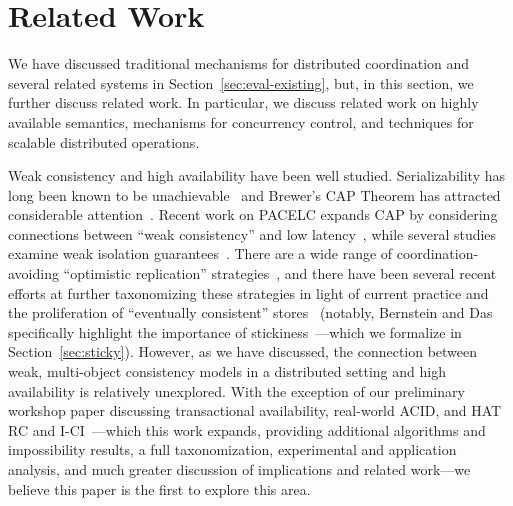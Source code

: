 
\section{Related Work}
\label{sec:relatedwork}

We have discussed traditional mechanisms for distributed
coordination and several related systems in
Section~\ref{sec:eval-existing}, but, in this section, we further discuss
related work. In particular, we discuss related work on highly
available semantics, mechanisms for concurrency control, and
techniques for scalable distributed operations.

Weak consistency and high availability have been well
studied. Serializability has long been known to be
unachievable~\cite{davidson-survey} and Brewer's CAP Theorem has
attracted considerable attention~\cite{gilbert-cap}. Recent work on
PACELC expands CAP by considering connections between ``weak
consistency'' and low latency~\cite{abadi-pacelc}, while several
studies examine weak isolation guarantees~\cite{adya,
  ansicritique}. There are a wide range of coordination-avoiding
``optimistic replication'' strategies~\cite{optimistic}, and there
have been several recent efforts at further taxonomizing these
strategies in light of current practice and the proliferation of
``eventually consistent'' stores~\cite{bailis-ec, bernstein-survey}
(notably, Bernstein and Das~\cite{bernstein-survey} specifically
highlight the importance of stickiness~\cite{sessionguarantees,
  vogels-defs}---which we formalize in Section~\ref{sec:sticky}).
However, as we have discussed, the connection between weak,
multi-object consistency models in a distributed setting and high
availability is relatively unexplored. With the exception of our
preliminary workshop paper discussing transactional availability,
real-world ACID, and HAT RC and I-CI~\cite{hat-hotos}---which this
work expands, providing additional algorithms and impossibility
results, a full taxonomization, experimental and application analysis,
and much greater discussion of implications and related work---we
believe this paper is the first to explore this area.


